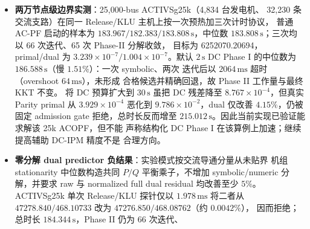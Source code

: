 \begin{itemize}
        Phase-II 分解，降至 compact DCOPF dispatch seed 的
        $11.088\,\mathrm{s}$/56/55；端到端中位数下降 $12.4\%$，分解下降
        $27.6\%$。两者目标分别为 315911.571480 与 315911.571406，终态
        primal/dual 均低于 $5\times10^{-7}$。case13659pegase 的 baseline dual
        为 1.970，预筛选零成本跳过 DC，保持 138 次迭代、137 次分解、目标
        386116.837520 及 $2.05\times10^{-7}/5.89\times10^{-9}$ 的最终证书。
        该路径按真实 Parity 初始指标选择 dispatch 点；9241 的 dual
        $838.166\to236.753$，但最大 primal metric
        $1.601\times10^{-3}\to1.506\times10^{-1}$，故它是 dual-dispatch
        warm start 而非 central-state 证书，最终 KKT 仍由 Phase II 独立认证。
        DC Phase I 的 $2000\,\mathrm{ms}$ 默认墙钟预算覆盖投影、formulation、
        结构初值、symbolic 与 numeric 工作；本例耗时 $1638\,\mathrm{ms}$、一次
        DC symbolic analyze，且 baseline/candidate 只共享构建一次的 Parity
        formulation。稀疏分解不可中断，故允许一个在途分解造成的可诊断超时。
  \item \textbf{两万节点级边界实测}：25,000-bus ACTIVSg25k（4,834 台发电机、
        32,230 条交流支路）在同一 Release/KLU 主机上按一次预热加三次计时协议，
        普通 AC-PF 启动的样本为 $183.967/182.383/183.808\,\mathrm{s}$，中位数
        $183.808\,\mathrm{s}$；三次均以 66 次迭代、65 次 Phase-II 分解收敛，
        目标为 6252070.20694，primal/dual 为
        $3.239\times10^{-7}/1.004\times10^{-7}$。默认 $2\,\mathrm{s}$ DC Phase I
        的中位数为 $186.588\,\mathrm{s}$（慢 $1.51\%$）：一次 symbolic、两次
        迭代后以 $2064\,\mathrm{ms}$ 超时（overshoot $64\,\mathrm{ms}$），未形成
        合格候选并精确回退，故 Phase II 工作量与最终 KKT 不变。
        将 DC 预算扩大到 $30\,\mathrm{s}$ 虽把 DC 残差降至
        $8.767\times10^{-4}$，但真实 Parity primal 从
        $3.929\times10^{-4}$ 恶化到 $9.786\times10^{-2}$，dual 仅改善
        $4.15\%$，仍被固定 admission gate 拒绝，总时长反而增至
        $215.012\,\mathrm{s}$。因此当前实现已验证能求解该 25k ACOPF，但不能
        声称结构化 DC Phase I 在该算例上加速；继续提高辅助 DC-IPM 精度不是
        合理方向。
  \item \textbf{零分解 dual predictor 负结果}：实验模式按交流导通分量从未贴界
        机组 stationarity 中位数构造共同 $P/Q$ 平衡乘子，不增加 symbolic/numeric
        分解，并要求 raw 与 normalized full dual residual 均改善至少 $5\%$。
        ACTIVSg25k 单次 Release/KLU 探针仅以 $1.978\,\mathrm{ms}$ 将二者从
        $47278.840/468.10733$ 改为 $47276.850/468.08762$（约 $0.0042\%$），
        因而拒绝；总时长 $184.344\,\mathrm{s}$，Phase II 仍为 66 次迭代、

\end{itemize}
